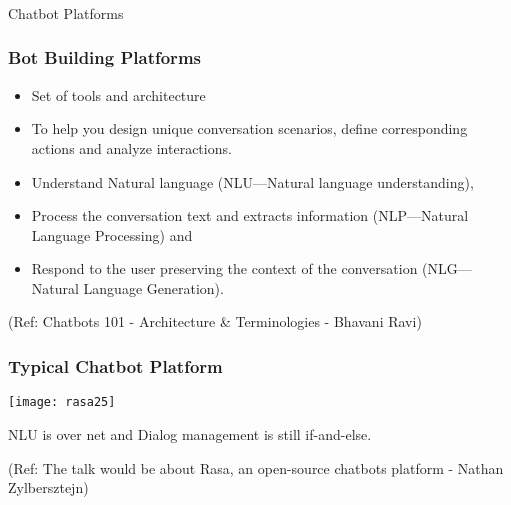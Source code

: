 \begin{frame}[fragile]\frametitle{}
\begin{center}
{\Large Chatbot Platforms}
\end{center}
\end{frame}

 \begin{frame}[fragile]\frametitle{Bot Building Platforms}
\begin{itemize}
\item Set of tools and architecture
\item To help you design unique conversation scenarios, define corresponding actions and analyze interactions.
\item Understand Natural language (NLU—Natural language understanding), 
\item Process the conversation text and extracts information (NLP—Natural Language Processing) and \item Respond to the user preserving the context of the conversation (NLG—Natural Language Generation).
\end{itemize}

{\tiny (Ref: Chatbots 101 - Architecture \& Terminologies -  Bhavani Ravi)}

\end{frame}

\begin{frame}[fragile]\frametitle{Typical Chatbot Platform}


\begin{center}
\texttt{[image: rasa25]}
\end{center}

NLU is over net and Dialog management is still if-and-else.

{\tiny (Ref: The talk would be about Rasa, an open-source chatbots platform - Nathan Zylbersztejn)}

\end{frame}



